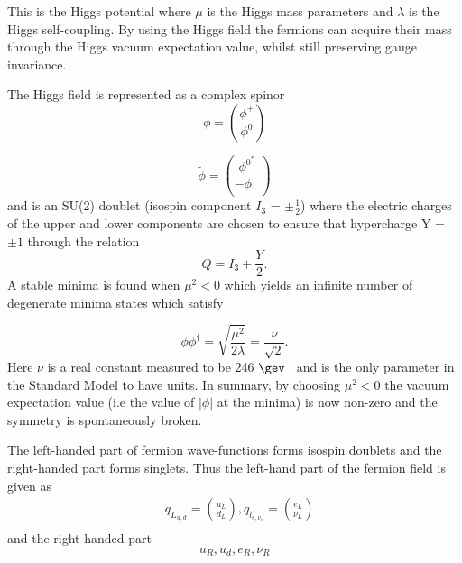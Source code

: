 This is the Higgs potential  where $\mu$ is the Higgs mass parameters and $\lambda$ is the Higgs self-coupling. By using the Higgs field the fermions can acquire their mass through the Higgs vacuum expectation value, whilst still preserving gauge invariance.

The Higgs field is represented as a complex spinor
\begin{equation}
  \phi = \binom{\phi^{+}}{\phi^{0}}
  \label{eq:higgsspin_1}
\end{equation}

\begin{equation}
  \tilde{\phi} = \binom{\phi^{0^{*}}}{-\phi^{-}}
  \label{eq:higgsspin_2}
\end{equation}
and is an SU(2) doublet (isospin component $I_{3}$ =  $\pm\frac{1}{2}$) where the electric charges of the upper and lower components are chosen to ensure that hypercharge Y  = $\pm 1$ through the relation 
\begin{equation}
  Q = I_{3}+\frac{Y}{2}.
\end{equation}
A stable minima is found when $\mu^{2}<0$ which yields an infinite number of degenerate minima states which satisfy

\begin{equation}
  \phi\phi^{\dagger} = \sqrt{\frac{\mu^{2}}{2\lambda}} = \frac{\nu}{\sqrt{2}}.
\end{equation}
Here $\nu$ is a real constant measured to be 246 $\gev$~\cite{vev} and is the only parameter in the Standard Model to have units. In summary, by choosing $\mu^{2}<0$ the vacuum expectation value (i.e the value of $|\phi|$ at the minima) is now non-zero and the symmetry is spontaneously broken. %
 

The left-handed part of fermion wave-functions forms isospin doublets and the right-handed part forms singlets. Thus the left-hand part of the fermion field is given as
\begin{equation}
  \begin{split}
    &q_{L_{u,d}} = \binom{u_{L}}{d_{L}}, q_{l_{e,\nu_{e}}} = \binom{e_{L}}{\nu_{L}}\\
    \end{split}
\end{equation}
and the right-handed part
\begin{equation}
  u_{R}, u_{d}, e_{R}, \nu_{R}
\end{equation}


